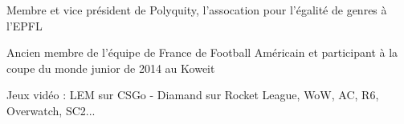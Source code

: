 


\begin{cventries}


\cventry
{} %
{}
{}
{}
{ %
\begin{cvitems}
\item {Membre et vice président de Polyquity, l'assocation pour l'égalité de genres à l'EPFL}
\item {Ancien membre de l'équipe de France de Football Américain et participant à la coupe du monde junior de 2014 au Koweit}
\item {Jeux vidéo : LEM sur CSGo - Diamand sur Rocket League, WoW, AC, R6, Overwatch, SC2...}
\end{cvitems}
}




\end{cventries}